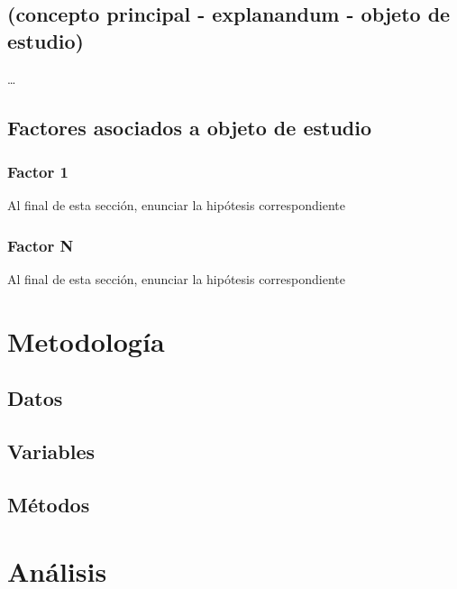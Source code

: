 \documentclass[12pt,twoside]{templates/facsothesis}
\begin{document}
\hypertarget{concepto-principal---explanandum---objeto-de-estudio}{%
\section{(concepto principal - explanandum - objeto de estudio)}\label{concepto-principal---explanandum---objeto-de-estudio}}

\ldots{}

\hypertarget{factores-asociados-a-objeto-de-estudio}{%
\section{Factores asociados a objeto de estudio}\label{factores-asociados-a-objeto-de-estudio}}

\hypertarget{factor-1}{%
\subsection{Factor 1}\label{factor-1}}

Al final de esta sección, enunciar la hipótesis correspondiente

\hypertarget{factor-n}{%
\subsection{Factor N}\label{factor-n}}

Al final de esta sección, enunciar la hipótesis correspondiente

\hypertarget{metodologuxeda}{%
\chapter{Metodología}\label{metodologuxeda}}

\hypertarget{datos}{%
\section{Datos}\label{datos}}

\hypertarget{variables}{%
\section{Variables}\label{variables}}

\hypertarget{muxe9todos}{%
\section{Métodos}\label{muxe9todos}}

\hypertarget{anuxe1lisis}{%
\chapter{Análisis}\label{anuxe1lisis}}
\end{document}
